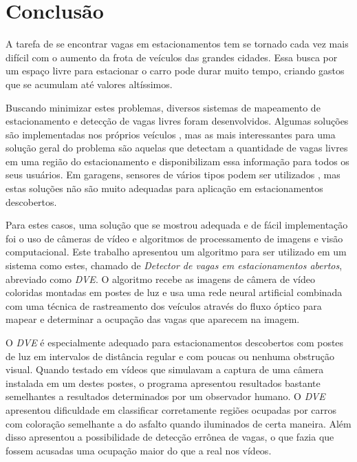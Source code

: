 \chapter{Conclusão}\label{cap:conclusao}

A tarefa de se encontrar vagas em estacionamentos tem se tornado cada vez mais difícil com o aumento da frota de veículos das grandes cidades. Essa busca por um espaço livre para estacionar o carro pode durar muito tempo, criando gastos que se acumulam até valores altíssimos.

Buscando minimizar estes problemas, diversos sistemas de mapeamento de estacionamento e detecção de vagas livres foram desenvolvidos. Algumas soluções são implementadas nos próprios veículos \cite{schmid2011parking}, mas as mais interessantes para uma solução geral do problema são aquelas que detectam a quantidade de vagas livres em uma região do estacionamento e disponibilizam essa informação para todos os seus usuários. Em garagens, sensores de vários tipos podem ser utilizados \cite{kianpisheh2012smart,lee2008intelligent,wolff2006parking}, mas estas soluções não são muito adequadas para aplicação em estacionamentos descobertos. 

Para estes casos, uma solução que se mostrou adequada e de fácil implementação foi o uso de câmeras de vídeo e algoritmos de processamento de imagens e visão computacional. Este trabalho apresentou um algoritmo para ser utilizado em um sistema como estes, chamado de \textit{Detector de vagas em estacionamentos abertos}, abreviado como \textit{DVE}. O algoritmo recebe as imagens de câmera de vídeo coloridas montadas em postes de luz e usa uma rede neural artificial combinada com uma técnica de rastreamento dos veículos através do fluxo óptico para mapear e determinar a ocupação das vagas que aparecem na imagem.

O \textit{DVE} é especialmente adequado para estacionamentos descobertos com postes de luz em intervalos de distância regular e com poucas ou nenhuma obstrução visual. Quando testado em vídeos que simulavam a captura de uma câmera instalada em um destes postes, o programa apresentou resultados bastante semelhantes a resultados determinados por um observador humano. O \textit{DVE} apresentou dificuldade em classificar corretamente regiões ocupadas por carros com coloração semelhante a do asfalto quando iluminados de certa maneira. Além disso apresentou a possibilidade de detecção errônea de vagas, o que fazia que fossem acusadas uma ocupação maior do que a real nos vídeos.

